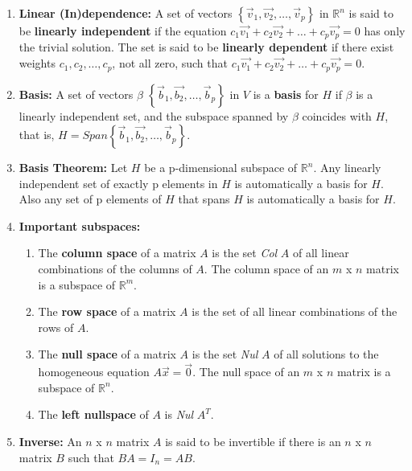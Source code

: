 \documentclass[11pt]{article}
\begin{document}
\begin{enumerate}
    \item \textbf{Linear (In)dependence:} A set of vectors $\left\{\vec{v}_1,\vec{v_2},\ldots,\vec{v}_p\right\}$ in $\mathbb{R}^n$ is said to be \textbf{linearly independent} if the equation $c_1\vec{v_1} + c_2\vec{v_2} + \ldots + c_p\vec{v_p} = 0$ has only the trivial solution. The set is said to be \textbf{linearly dependent} if there exist weights $c_1, c_2,\ldots, c_p$, not all zero, such that $c_1\vec{v_1} + c_2\vec{v_2} + \ldots + c_p\vec{v_p} = 0$.

    \item \textbf{Basis:} A set of vectors $\beta$ $\left\{\vec{b}_1,\vec{b_2},\ldots,\vec{b}_p\right\}$ in $V$ is a \textbf{basis} for $H$ if $\beta$ is a linearly independent set, and the subspace spanned by $\beta$ coincides with $H$, that is, $H = Span\left\{\vec{b}_1,\vec{b_2},\ldots,\vec{b}_p\right\}$.
    
    \item \textbf{Basis Theorem:} Let $H$ be a p-dimensional subspace of $\mathbb{R}^n$. Any linearly independent set of exactly p elements in $H$ is automatically a basis for $H$. Also any set of p elements of $H$ that spans $H$ is automatically a basis for $H$.
    
    \item \textbf{Important subspaces:}
    \begin{enumerate}
    
    \item The \textbf{column space} of a matrix $A$ is the set \textit{Col} $A$ of all linear combinations of the columns of $A$. The column space of an $m$ x $n$ matrix is a subspace of $\mathbb{R}^m$. 
    
    \item The \textbf{row space} of a matrix $A$ is the set of all linear combinations of the rows of $A$. 
    
    \item The \textbf{null space} of a matrix $A$ is the set \textit{Nul} $A$ of all solutions to the homogeneous equation $A\vec{x} = \vec{0}$. The null space of an $m$ x $n$ matrix is a subspace of $\mathbb{R}^n$.
    
    \item The \textbf{left nullspace} of $A$ is \textit{Nul} $A^T$.
    \end{enumerate}
    \item \textbf{Inverse:} An $n$ x $n$ matrix $A$ is said to be invertible if there is an $n$ x $n$ matrix $B$ such that $BA = I_n = AB$.
    

\end{enumerate}
\end{document}
